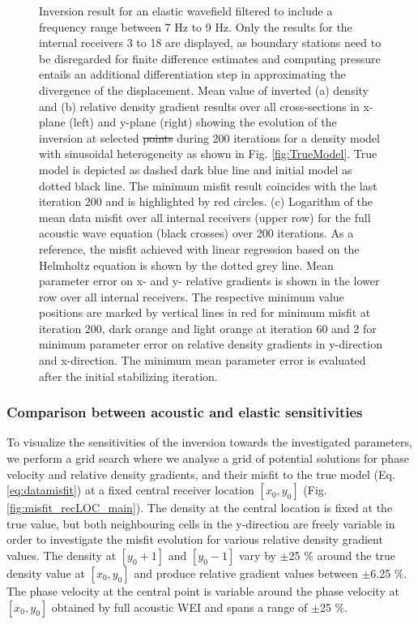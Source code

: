 \documentclass{article} %
\providecommand{\DIFaddtex}[1]{{\protect\color{blue}\uwave{#1}}} %
\providecommand{\DIFdeltex}[1]{{\protect\color{red}\sout{#1}}}                      %
\providecommand{\DIFaddFL}[1]{\DIFadd{#1}} %
\providecommand{\DIFdelFL}[1]{\DIFdel{#1}} %
\providecommand{\DIFaddbeginFL}{} %
\providecommand{\DIFaddendFL}{} %
\providecommand{\DIFdelbeginFL}{} %
\providecommand{\DIFdelendFL}{} %
\providecommand{\DIFadd}[1]{\texorpdfstring{\DIFaddtex{#1}}{#1}} %
\providecommand{\DIFdel}[1]{\texorpdfstring{\DIFdeltex{#1}}{}} %
\newcommand{\DIFscaledelfig}{0.5}
\newlength{\DIFdelgraphicswidth} %
\newlength{\DIFdelgraphicsheight} %
\newcommand{\DIFaddincludegraphics}[2][]{{\color{blue}\fbox{\DIFOincludegraphics[#1]{#2}}}} %
\newcommand{\DIFdelincludegraphics}[2][]{%
\sbox{\DIFdelgraphicsbox}{\DIFOincludegraphics[#1]{#2}}%
\settoboxwidth{\DIFdelgraphicswidth}{\DIFdelgraphicsbox} %
\settoboxtotalheight{\DIFdelgraphicsheight}{\DIFdelgraphicsbox} %
\scalebox{\DIFscaledelfig}{%
\parbox[b]{\DIFdelgraphicswidth}{\usebox{\DIFdelgraphicsbox}\\[-\baselineskip] \rule{\DIFdelgraphicswidth}{0em}}\llap{\resizebox{\DIFdelgraphicswidth}{\DIFdelgraphicsheight}{%
\setlength{\unitlength}{\DIFdelgraphicswidth}%
\begin{picture}(1,1)%
\thicklines\linethickness{2pt} %
{\color[rgb]{1,0,0}\put(0,0){\framebox(1,1){}}}%
{\color[rgb]{1,0,0}\put(0,0){\line( 1,1){1}}}%
{\color[rgb]{1,0,0}\put(0,1){\line(1,-1){1}}}%
\end{picture}%
}\hspace*{3pt}}} %
} %
\DeclareRobustCommand{\DIFaddbeginFL}{\DIFOaddbeginFL \let\includegraphics\DIFaddincludegraphics} %
\DeclareRobustCommand{\DIFaddendFL}{\DIFOaddendFL \let\includegraphics\DIFOincludegraphics} %
\DeclareRobustCommand{\DIFdelbeginFL}{\DIFOdelbeginFL \let\includegraphics\DIFdelincludegraphics} %
\DeclareRobustCommand{\DIFdelendFL}{\DIFOaddendFL \let\includegraphics\DIFOincludegraphics} %
\begin{document}
\begin{figure}[H]
\begin{subfigure}[c]{0.65\linewidth}
		\end{subfigure}
		\caption{Inversion result for an elastic wavefield filtered to include a frequency range between 7 Hz to 9 Hz. Only the results for the internal receivers 3 to 18 are displayed, as boundary stations need to be disregarded for finite difference estimates and computing pressure entails an additional differentiation step in approximating the divergence of the displacement. Mean value of inverted (a) density and (b) relative density gradient results over all cross-sections in x-plane (left) and y-plane (right) showing the evolution of the inversion at selected \DIFdelbeginFL \DIFdelFL{points }\DIFdelendFL \DIFaddbeginFL \DIFaddFL{stages }\DIFaddendFL during 200 iterations for a density model with sinusoidal heterogeneity as shown in Fig. \ref{fig:TrueModel}. True model is depicted as dashed dark blue line and initial model as dotted black line. The minimum misfit result coincides with the last iteration 200 and is highlighted by red circles. (c) Logarithm of the mean data misfit over all internal receivers (upper row) for the full acoustic wave equation (black crosses) over 200 iterations. As a reference, the misfit achieved with linear regression based on the Helmholtz equation is shown by the dotted grey line. Mean parameter error on x- and y- relative gradients is shown in the lower row over all internal receivers. The respective minimum value positions are marked by vertical lines in red for minimum misfit at iteration 200, dark orange and light orange at iteration 60 and 2 for minimum parameter error on relative density gradients in y-direction and x-direction. The minimum mean parameter error is evaluated after the initial stabilizing iteration. }
		\label{fig:el_results}
	\end{figure}

	 \subsubsection{Comparison between acoustic and elastic sensitivities} \label{sec:sensitivities}

	 To visualize the sensitivities of the inversion towards the investigated parameters, we perform a grid search where we analyse a grid of potential solutions for phase velocity and relative density gradients, and their misfit to the true model (Eq. \ref{eq:datamisfit}) at a fixed central receiver location $[x_{0},y_{0}]$ (Fig. \ref{fig:misfit_recLOC_main}). The density at the central location is fixed at the true value, but both neighbouring cells in the y-direction are freely variable in order to investigate the misfit evolution for various relative density gradient values. The density at $[y_{0}+1]$ and $[y_{0}-1]$ vary by $\pm$25 $\%$ around the true density value at $[x_{0},y_{0}]$ and produce relative gradient values between $\pm$6.25 $\%$. The phase velocity at the central point is variable around the phase velocity at $[x_{0},y_{0}]$ obtained by full acoustic WEI and spans a range of $\pm$25 $\%$. \\ %
\end{document}
